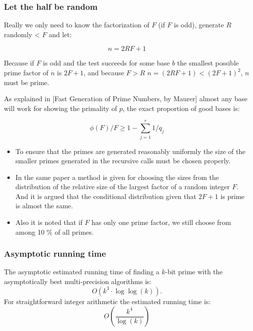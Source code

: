 \documentclass{beamer}
\begin{document}
\begin{frame}
\frametitle{Let the half be random}
Really we only need to know the factorization of $F$ (if $F$ is odd),
generate $R$ randomly < $F$ and let:

\[n = 2RF+1\] 

Because if $F$
is odd and the test succeeds for some base $b$ the smallest possible
prime factor of $n$ is $2F+1$, and because $F>R$ $n=(2RF+1)<(2F+1)^2$,
$n$ must be prime.
\end{frame}
\begin{frame}
  As explained in [Fast Generation of Prime Numbers, by Maurer] almost
  any base will work for showing the primality of $p$, the exact
  proportion of good bases is:

\[\phi(F)/F \geq 1-\sum^r_{j=1}1/q_j\]
\end{frame}
\begin{frame}
  \begin{itemize}
\item 
    To ensure that the primes are generated reasonably uniformly the
    size of the smaller primes generated in the recursive calls must
    be chosen properly.
\pause
\item
    In the same paper a method is given for choosing the
    sizes from the distribution of the relative size of the largest
    factor of a random integer $F$. And it is argued that the
    conditional distribution given that $2F+1$ is prime is almost the
    same.
\pause
\item
    Also it is noted that if $F$ has only one prime factor, we still
    choose from among 10 \% of all primes.
    
  \end{itemize}
\end{frame}
\begin{frame}
  \frametitle{Asymptotic running time}
The asymptotic estimated running time of finding a $k$-bit prime with the
asymptotically best multi-precision algorithms is:
\[O(k^3\cdot\log\log(k)).\]
For straightforward integer arithmetic the estimated running time is:
\[O(\frac{k^{4}}{\log(k)})\]
\end{frame}
\end{document}
